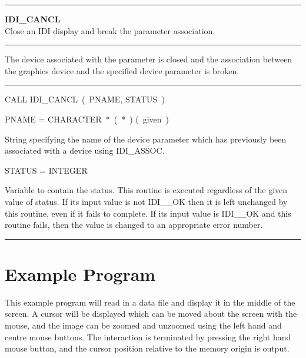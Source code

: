 \parbox{160mm}{

\rule{160mm}{0.5mm}

\hspace*{10mm}\parbox{140mm}{
{\bf IDI\_CANCL} \\
Close an IDI display and break the parameter association.}

\rule{160mm}{0.1mm}

\hspace*{10mm}\parbox{140mm}{
The device associated with the parameter is closed and the association
between the graphics device and the specified device parameter is broken.}

\rule{160mm}{0.1mm}

\hspace*{10mm}\parbox{140mm}{
CALL IDI\_CANCL~(~PNAME, STATUS~)}

\hspace*{10mm}\parbox{140mm}{
PNAME = CHARACTER~*~(~*~) \hspace{10mm} (~given~)}

\hspace*{30mm}\parbox{120mm}{
String specifying the name of the device parameter which has previously
been associated with a device using IDI\_ASSOC.}

\hspace*{10mm}\parbox{140mm}{
STATUS = INTEGER}

\hspace*{30mm}\parbox{120mm}{
Variable to contain the status. This routine is executed regardless of the
given value of status. If its input value is not IDI\_\_OK then it is left
unchanged by this routine, even if it fails to complete. If its input value
is IDI\_\_OK and this routine fails, then the value is changed to an
appropriate error number.}

\rule{160mm}{0.5mm}
}


\newpage
\section{Example Program}
\label{se:exp}

This example program will read in a data file and display it in the
middle of the screen. A cursor will be displayed which can be
moved about the screen with the mouse, and the image can be zoomed
and unzoomed using the left hand and centre mouse buttons. The
interaction is terminated by pressing the right hand mouse button, and
the cursor position relative to the memory origin is output.

